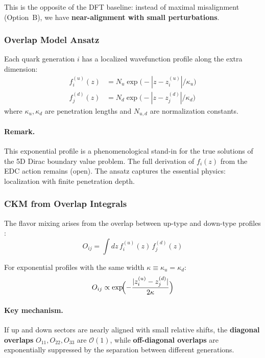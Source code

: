 This is the opposite of the DFT baseline: instead of maximal misalignment
(Option~B), we have \textbf{near-alignment with small perturbations}.

\subsubsection{Overlap Model Ansatz}

\begin{postulate}
\label{post:ch7_overlap_ansatz}
Each quark generation $i$ has a localized wavefunction profile along the
extra dimension:
\begin{align}
    f_i^{(u)}(z) &= N_u \exp\!\bigl(-|z - z_i^{(u)}|/\kappa_u\bigr)
    \label{eq:ch7_profile_u} \\
    f_j^{(d)}(z) &= N_d \exp\!\bigl(-|z - z_j^{(d)}|/\kappa_d\bigr)
    \label{eq:ch7_profile_d}
\end{align}
where $\kappa_u, \kappa_d$ are penetration lengths and $N_{u,d}$ are
normalization constants.
\end{postulate}

\paragraph{Remark.}
This exponential profile is a phenomenological stand-in for the true solutions
of the 5D Dirac boundary value problem. The full derivation of $f_i(z)$ from
the EDC action remains (open). The ansatz captures the essential physics:
localization with finite penetration depth.

\subsubsection{CKM from Overlap Integrals}

The flavor mixing arises from the overlap between up-type and down-type
profiles \tagDc{}:
\begin{equation}
    O_{ij} = \int dz\, f_i^{(u)}(z)\, f_j^{(d)}(z)
    \label{eq:ch7_overlap_def}
\end{equation}

For exponential profiles with the same width $\kappa \equiv \kappa_u = \kappa_d$:
\begin{equation}
    O_{ij} \propto \exp\!\Bigl(-\frac{|z_i^{(u)} - z_j^{(d)}|}{2\kappa}\Bigr)
    \label{eq:ch7_overlap_exp}
\end{equation}

\paragraph{Key mechanism.}
If up and down sectors are nearly aligned with small relative shifts, the
\textbf{diagonal overlaps} $O_{11}, O_{22}, O_{33}$ are $\mathcal{O}(1)$,
while \textbf{off-diagonal overlaps} are exponentially suppressed by the
separation between different generations.

